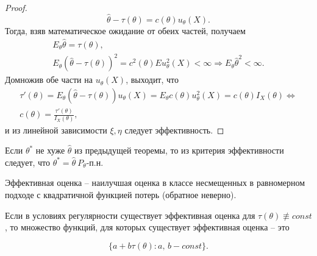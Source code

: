 \begin{proof}
\begin{equation*}
\hat{\theta } -\tau ( \theta ) =c( \theta ) u_{\theta }( X) .
\end{equation*}
Тогда, взяв математическое ожидание от обеих частей, получаем
\begin{gather*}
E_{\theta }\hat{\theta } =\tau ( \theta ) ,\\
E_{\theta }(\hat{\theta } -\tau ( \theta ))^{2} =c^{2}( \theta ) Eu_{\theta }^{2}( X) < \infty \Rightarrow E_{\theta }\hat{\theta }^2 < \infty .
\end{gather*}
Домножив обе части на $\displaystyle u_{\theta }( X)$, выходит, что
\begin{gather*}
\tau '( \theta ) =E_{\theta }(\hat{\theta } -\tau ( \theta )) u_{\theta }( X) =E_{\theta } c( \theta ) u_{\theta }^{2}( X) =c( \theta ) I_{X}( \theta ) \Leftrightarrow \\
c( \theta ) =\frac{\tau '( \theta )}{I_{X}( \theta )} ,
\end{gather*}
и из линейной зависимости $\displaystyle \xi ,\eta $ следует эффективность.
\end{proof}
\begin{corollary}
Если $\displaystyle \theta ^{*}$ не хуже $\displaystyle \hat{\theta} $ из предыдущей теоремы, то из критерия эффективности следует, что $\displaystyle \theta ^{*} =\hat{\theta } \ P_{\theta }$-п.н.
\end{corollary}
\begin{note}
Эффективная оценка -- наилучшая оценка в классе несмещенных в равномерном подходе с квадратичной функцией потерь (обратное неверно).
\end{note}
\begin{theorem}
Если в условиях регулярности существует эффективная оценка для $\displaystyle \tau ( \theta ) \nequiv const$, то множество функций, для которых существует эффективная оценка -- это


\begin{equation*}
\{a+b\tau ( \theta ):a,\, b-const\} .
\end{equation*}
\end{theorem}
